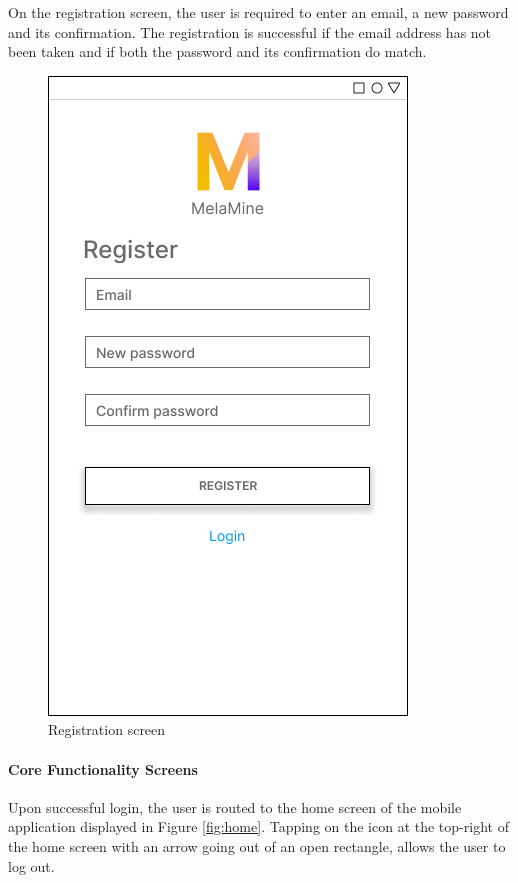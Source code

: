 \documentclass[12pt, a4paper]{article}
\begin{document}
On the registration screen, the user is required to enter an email, a new password and its confirmation. The registration is successful if the email address has not been taken and if both the password and its confirmation do match. 
\begin{figure}[h]
    \centering
    \setlength{\fboxsep}{8pt}
    \includegraphics[scale=0.45, fbox]{Register.png}
    \caption{Registration screen}
    \label{fig:register}
\end{figure}
\paragraph{Core Functionality Screens}
Upon successful login, the user is routed to the home screen of the mobile application displayed in Figure \ref{fig:home}. Tapping on the icon at the top-right of the home screen with an arrow going out of an open rectangle, allows the user to log out.
\end{document}
